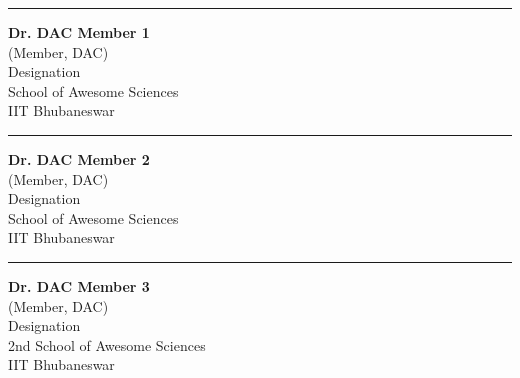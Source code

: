 \vspace*{1em}
\begin{center}
    \begin{minipage}{0.31\textwidth}
    \begin{flushleft}
        \hrule\vspace{2ex}
        {\small {\bfseries Dr. DAC Member 1}\\
        (Member, DAC)\\
        Designation\\
        School of Awesome Sciences\\
        IIT Bhubaneswar}
    \end{flushleft}
    \end{minipage}
    \hfill
    \begin{minipage}{0.31\textwidth}
    \begin{center}
        \hrule\vspace{2ex}
        {\small {\bfseries Dr. DAC Member 2}\\
        (Member, DAC)\\
        Designation\\
        School of Awesome Sciences\\
        IIT Bhubaneswar}
    \end{center}
    \end{minipage}
    \hfill
    \begin{minipage}{0.31\textwidth}
    \begin{flushright}
        \hrule\vspace{2ex}
        {\small {\bfseries Dr. DAC Member 3}\\
        (Member, DAC)\\
        Designation\\
        2nd School of Awesome Sciences\\
        IIT Bhubaneswar}
    \end{flushright}
    \end{minipage}
\end{center}

